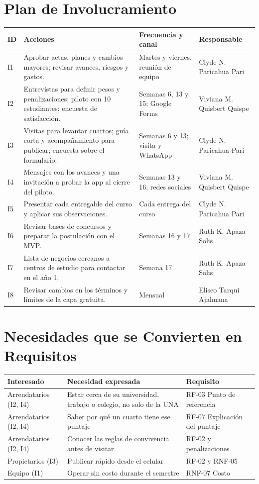 \documentclass[11pt,a4paper]{article}
\begin{document}
\section{Plan de Involucramiento}
{\small
{}
\noindent\begin{tabularx}{\textwidth}{@{}C{0.6cm} L P{2.4cm} P{2.3cm}@{}}
\toprule
{}
\textbf{ID} & \textbf{Acciones} & \textbf{Frecuencia y canal} & \textbf{Responsable} \\
\midrule
I1 & Aprobar actas, planes y cambios mayores; revisar avances, riesgos y gastos. & Martes y viernes, reunión de equipo & Clyde N. Paricahua Pari \\
I2 & Entrevistas para definir pesos y penalizaciones; piloto con 10 estudiantes; encuesta de satisfacción. & Semanas 6, 13 y 15; Google Forms & Viviana M. Quisbert Quispe \\
I3 & Visitas para levantar cuartos; guía corta y acompañamiento para publicar; encuesta sobre el formulario. & Semanas 6 y 13; visita y WhatsApp & Clyde N. Paricahua Pari \\
I4 & Mensajes con los avances y una invitación a probar la app al cierre del piloto. & Semanas 13 y 16; redes sociales & Viviana M. Quisbert Quispe \\
I5 & Presentar cada entregable del curso y aplicar sus observaciones. & Cada entrega del curso & Clyde N. Paricahua Pari \\
I6 & Revisar bases de concursos y preparar la postulación con el MVP. & Semanas 16 y 17 & Ruth K. Apaza Solis \\
I7 & Lista de negocios cercanos a centros de estudio para contactar en el año 1. & Semana 17 & Ruth K. Apaza Solis \\
I8 & Revisar cambios en los términos y límites de la capa gratuita. & Mensual & Eliseo Tarqui Ajahuana \\
\bottomrule
\end{tabularx}
}

\section{Necesidades que se Convierten en Requisitos}
{\small
{}
\noindent\begin{tabularx}{\textwidth}{@{}P{3.2cm} L P{2.6cm}@{}}
\toprule
{}
\textbf{Interesado} & \textbf{Necesidad expresada} & \textbf{Requisito} \\
\midrule
Arrendatarios (I2, I4) & Estar cerca de su universidad, trabajo o colegio, no solo de la UNA & RF-03 Punto de referencia \\
Arrendatarios (I2, I4) & Saber por qué un cuarto tiene ese puntaje & RF-07 Explicación del puntaje \\
Arrendatarios (I2, I4) & Conocer las reglas de convivencia antes de visitar & RF-02 y penalizaciones \\
Propietarios (I3) & Publicar rápido desde el celular & RF-02 y RNF-05 \\
Equipo (I1) & Operar sin costo durante el semestre & RNF-07 Costo \\
\bottomrule
\end{tabularx}
}
\end{document}
